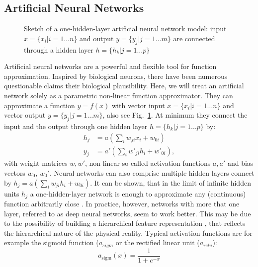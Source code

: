	\subsection{Artificial Neural Networks}\label{sec:neuralnetworks}

		\begin{figure}[htp]
			\centering
			
			\caption{Sketch of a one-hidden-layer artificial neural network model: input $x = \{ x_i | i = 1 \ldots n \}$ and output $y = \{ y_j | j = 1 \ldots m \}$ are connected through a hidden layer $h = \{h_k | j = 1 \ldots p \}$ }
			\label{fig:neuralnet}
		\end{figure}
		Artificial neural networks are a powerful and flexible tool for function approximation. Inspired by biological neurons, there have been numerous questionable claims \wrt their biological plausibility. %
		Here, we will treat an artificial network solely as a parametric non-linear function approximator. They can approximate a function $y = f(x)$ with vector input $x = \{ x_i | i = 1 \ldots n \}$ and vector output $y = \{ y_j | j = 1 \ldots m \}$, also see Fig.~\ref{fig:neuralnet}. At minimum they connect the input and the output through one hidden layer $h = \{h_k | j = 1 \ldots p \}$ by:
		\begin{equation} \label{eq1}
			\begin{split}
				h_j & =  a (\sum_i w_{ji} x_i + w_{0i})  \\
				y_j & =  a' (\sum_i w'_{ji} h_i + w'_{0i}),
			\end{split}
		\end{equation}
		with weight matrices $w, w'$, non-linear so-called activation functions $a, a'$  and bias vectors $w_{0}$, $w_{0}'$.
		Neural networks can also comprise multiple hidden layers connect by $h_j  =  a (\sum_i w_{ji} h_i + w_{0i})$.
		It can be shown, that in the limit of infinite hidden units $h_j$ a one-hidden-layer network is enough to approximate any (continuous) function arbitrarily close \cite{cybenko89approx, hornik91approx}.
		In practice, however, networks with more that one layer, referred to as deep neural networks, seem to work better. This may be due to the possibility of building a hierarchical feature representation \cite{zeiler14vis}, that reflects the hierarchical nature of the physical reality.
		Typical activation functions are for example the sigmoid function ($a_{sigm}$ or the rectified linear unit ($a_{relu}$):
		\begin{equation}
			a_{\textrm{sigm}}(x)= \frac{1}{1+e^{-x}}
		\end{equation}
